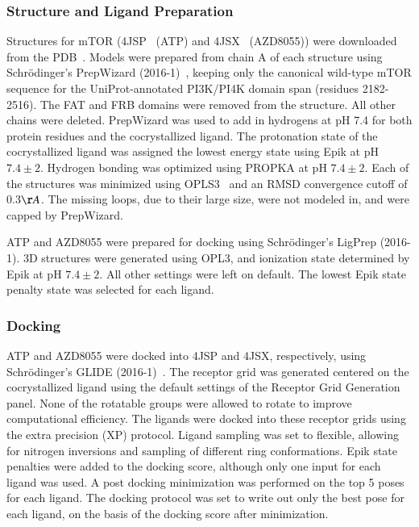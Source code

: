 \documentclass[phd,tocprelim]{cornell}
\begin{document}
\subsubsection{Structure and Ligand Preparation}
Structures for mTOR (4JSP~\citep{Yang:2013gaa} (ATP) and 4JSX~\citep{Yang:2013gaa} (AZD8055)) were downloaded from the PDB~\citep{Berman2002-hg}. 
Models were prepared from chain A of  each structure using Schr{\"o}dinger's PrepWizard (2016-1)~\citep{Sastry2013-ax}, keeping only the canonical wild-type mTOR sequence for the UniProt-annotated PI3K/PI4K domain span (residues 2182-2516). The FAT and FRB domains were removed from the structure. All other chains were deleted. PrepWizard was used to add in hydrogens at pH 7.4 for both protein residues and the cocrystallized ligand. The protonation state of the cocrystallized ligand was assigned the lowest energy state using Epik at pH $7.4\pm2$. Hydrogen bonding was optimized using PROPKA at pH $7.4\pm2$. Each of the structures was minimized using OPLS3~\citep{Harder:J.Chem.TheoryComput.:2016} and an RMSD convergence cutoff of 0.3$\AA$. The missing loops, due to their large size, were not modeled in, and were capped by PrepWizard. 

ATP and AZD8055 were prepared for docking using Schr{\"o}dinger's LigPrep (2016-1). 3D structures were generated using OPL3, and ionization state determined by Epik at pH $7.4\pm2$. All other settings were left on default. The lowest Epik state penalty state was selected for each ligand. 

\subsubsection{Docking}
ATP and AZD8055 were docked into 4JSP and 4JSX, respectively, using Schr{\"o}dinger's GLIDE (2016-1)~\citep{Friesner:2004hm,Halgren:2004dr,Friesner:2006cp}. The receptor grid was generated centered on the cocrystallized ligand using the default settings of the Receptor Grid Generation panel. None of the rotatable groups were allowed to rotate to improve computational efficiency. The ligands were docked into these receptor grids using the extra precision (XP) protocol. Ligand sampling was set to flexible, allowing for nitrogen inversions and sampling of different ring conformations. Epik state penalties were added to the docking score, although only one input for each ligand was used. A post docking minimization was performed on the top 5 poses for each ligand. The docking protocol was set to write out only the best pose for each ligand, on the basis of the docking score after minimization. 
\end{document}

